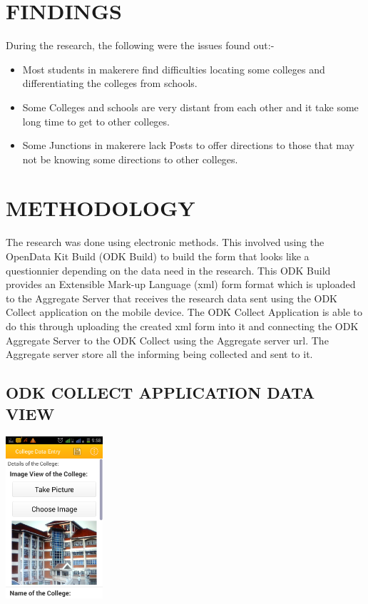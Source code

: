 \documentclass[12pt]{article}
\begin{document}
\section{FINDINGS}
During the research, the following were the issues found out:-
\begin{itemize}
\item  	 Most students in makerere find difficulties locating some colleges and differentiating the colleges from schools.

\item	 Some Colleges and schools are very distant from each other and it take some long time to get to other colleges.

\item	 Some Junctions in makerere lack Posts to offer directions to those that may not be knowing some directions to other colleges.


\end{itemize}

\section{METHODOLOGY}
The research was done using electronic methods. This involved using the OpenData Kit Build (ODK Build) to build the form that looks like a questionnier depending on the data need in the research. This ODK Build provides an Extensible Mark-up Language (xml) form format which is uploaded to the Aggregate Server that receives the research data sent using the ODK Collect application on the mobile device. The ODK Collect Application is able to do this through uploading the created xml form into it and connecting the ODK Aggregate Server to the ODK Collect using the Aggregate server url. The Aggregate server store all the informing being collected and sent to it.

\subsection{ODK COLLECT APPLICATION DATA VIEW}

\includegraphics[width=0.3\linewidth, height=6cm]{datacollect}\\
\end{document}
